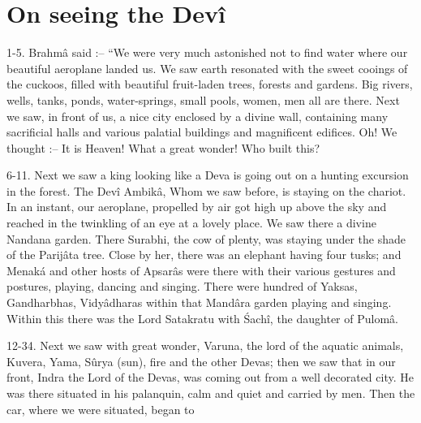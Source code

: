 ﻿\chapter{On seeing the Dev\^i}

1-5. Brahm\^a said :-- ``We were very much astonished not to find water where our beautiful aeroplane landed us. We saw earth resonated with the sweet cooings of the cuckoos, filled with beautiful fruit-laden trees, forests and gardens. Big rivers, wells, tanks, ponds, water-springs, small pools, women, men all are there. Next we saw, in front of us, a nice city enclosed by a divine wall, containing many sacrificial halls and various palatial buildings and magnificent edifices. Oh! We thought :-- It is Heaven! What a great wonder! Who built this?

6-11. Next we saw a king looking like a Deva is going out on a hunting excursion in the forest. The Dev\^i Ambik\^a, Whom we saw before, is staying on the chariot. In an instant, our aeroplane, propelled by air got high up above the sky and reached in the twinkling of an eye at a lovely place. We saw there a divine Nandana garden. There Surabhi, the cow of plenty, was staying under the shade of the Parij\^ata tree. Close by her, there was an elephant having four tusks; and Menaká and other hosts of Apsar\^as were there with their various gestures and postures, playing, dancing and singing. There were hundred of Yaksas, Gandharbhas, Vidy\^adharas within that Mand\^ara garden playing and singing. Within this there was the Lord Satakratu with \'Sach\^i, the daughter of Pulom\^a.

12-34. Next we saw with great wonder, Varuna, the lord of the aquatic animals, Kuvera, Yama, Sûrya (sun), fire and the other Devas; then we saw that in our front, Indra the Lord of the Devas, was coming out from a well decorated city. He was there situated in his palanquin, calm and quiet and carried by men. Then the car, where we were situated, began to

